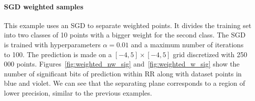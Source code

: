 \documentclass[11pt]{article}
\newcommand{\tristan}[1]{\color{orange}\textbf{From Tristan:} #1\color{black}\xspace}
\newcommand{\pytracer}[0]{PyTracer\xspace}
\begin{document}



\paragraph{SGD weighted samples}
This example uses an SGD to separate weighted points. It divides the training set into two classes of 10 points with a bigger weight for the second class. The SGD is trained with hyperparameters $\alpha=0.01$ and a maximum number of iterations to 100. The prediction is made on a $[-4,5]\times[-4,5]$ grid discretized with 250 000 points. Figures~\ref{fig:weighted_nw_sig} and~\ref{fig:weighted_w_sig} show the number of significant bits 
of prediction within RR along with dataset points in blue and violet.
We can see that the separating plane corresponds to a region of lower precision, similar to the previous examples. 



\end{document}
